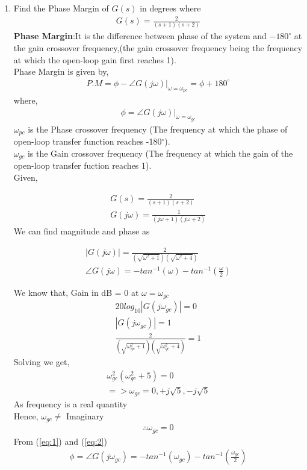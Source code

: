 \begin{enumerate}[label=\thesection.\arabic*.,ref=\thesection.\theenumi]

\item
Find the Phase Margin of $G(s)$ in degrees where
\begin{align}
G(s) = \frac{2}{(s+1)(s+2)}
\end{align}
\solution \textbf{Phase Margin}:It is the difference between phase of the system and $-180^{\circ}$ at the gain crossover frequency,(the gain crossover frequency being the frequency at which the open-loop gain first reaches 1).\\
Phase Margin is given by,
\begin{align}
P.M=\phi-\angle G(j\omega)|_{\omega=\omega_{pc}}=\phi+180^{\circ}
\end{align}
where,
\begin{align}
\phi=\angle G(j\omega)|_{\omega=\omega_{gc}}
\label{eq:1}
\end{align}
$\omega_{pc}$ is the Phase crossover frequency (The frequency at which the phase of open-loop transfer function reaches -180$^{\circ}$).\\
$\omega_{gc}$ is the Gain crossover frequency (The frequency at which the gain of the open-loop transfer fuction reaches 1).\\
Given,

\begin{align}
G(s) = \frac{2}{(s+1)(s+2)} 
\\
G(j\omega)=\frac{1}{(j\omega+1)(j\omega+2)} 
\end{align}
We can find magnitude and phase as

\begin{align}
|G(j\omega)|=\frac{2}{(\sqrt{\omega^2+1})(\sqrt{\omega^2+4})}
\\
\angle G(j\omega)=- tan^{-1}(\omega) - tan^{-1}(\frac{\omega}{2}) \label{eq:2}
\end{align}

We know that,
Gain in dB = 0 at $\omega=\omega_{gc}$
\begin{align}
20log_{10}|G(j\omega_{gc})|=0 
\\
|G(j\omega_{gc})|=1
\\
\frac{2}{(\sqrt{\omega_{gc}^2+1})(\sqrt{\omega_{gc}^2+4})}=1
\end{align}
Solving we get,
\begin{align}
\omega^2_{gc}(\omega^2_{gc}+5)=0
\\
=> \omega_{gc}=0,+j\sqrt{5},-j\sqrt{5}
\end{align}
As frequency is a real quantity
\\Hence, $\omega_{gc} \neq$ Imaginary
\begin{align}
\therefore  \omega_{gc} =0
\end{align}
From (\ref{eq:1}) and (\ref{eq:2})
\begin{align}
\phi= \angle G(j\omega_{gc})= -tan^{-1}(\omega_{gc})-tan^{-1}(\frac{\omega_{gc}}{2})
\end{align}


\end{enumerate}
